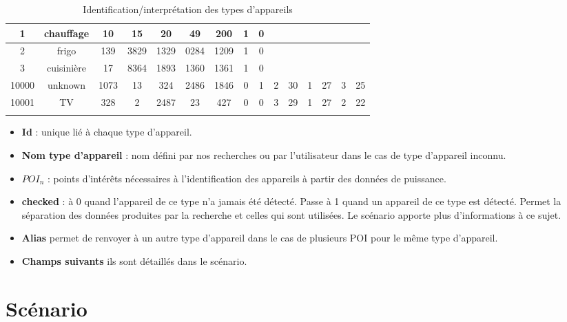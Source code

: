 \documentclass[10pt,a4paper]{article}
\begin{document}
\begin{enumerate}
\begin{table}[h]
{\begin{tabular}{|c|c|c|c|c|c|c|c|c|c|c|c|c|c|c|}
1 & chauffage & 10 & 15 & 20 & 49 & 200 & 1 & 0 &  &  &  &  &  &  \\ \hline
2 & frigo & 139 & 3829 & 1329 & 0284 & 1209 & 1 & 0 &  &  &  &  &  &  \\ \hline
3 & cuisinière & 17 & 8364 & 1893 & 1360 & 1361 & 1 & 0  &  &  &  &  &  &  \\ \hline
10000 & unknown & 1073 & 13 & 324 & 2486 & 1846 & 0 & 1 & 2 & 30 & 1 & 27 & 3 & 25 \\ \hline
10001 & TV & 328 & 2 & 2487 & 23 & 427 & 0 & 0 & 3 & 29 & 1 & 27 & 2 & 22 \\ \hline
 &  &  &  &  &  &  &  &  &  &  &  &  &  & 
\end{tabular}
}
\caption{Identification/interprétation des types d'appareils}
\end{table} 
\begin{itemize}
\item \textbf{Id} : unique lié à chaque type d'appareil.
\item \textbf{Nom type d'appareil} : nom défini par nos recherches ou par l'utilisateur dans le cas de type d'appareil inconnu.
\item \textbf{$POI_n$} : points d'intérêts nécessaires à l'identification des appareils à partir des données de puissance.
\item \textbf{checked} : à 0 quand l'appareil de ce type n'a jamais été détecté. Passe à 1 quand un appareil de ce type est détecté. Permet la séparation des données produites par la recherche et celles qui sont utilisées. Le scénario apporte plus d'informations à ce sujet.
\item \textbf{Alias} permet de renvoyer à un autre type d'appareil dans le cas de plusieurs POI pour le même type d'appareil.
\item \textbf{Champs suivants} ils sont détaillés dans le scénario.
\end{itemize}
\end{enumerate}
\newpage
\section{Scénario}
\end{document}
